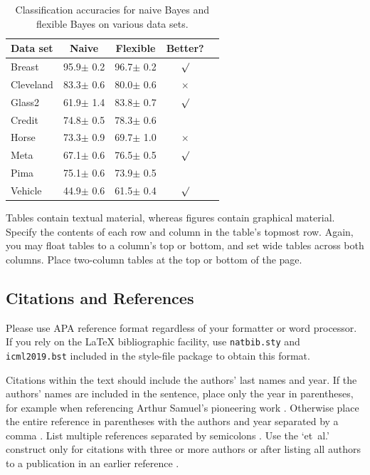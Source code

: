 \documentclass{article}
\begin{document}
\begin{table}[t]
\caption{Classification accuracies for naive Bayes and flexible
Bayes on various data sets.}
\label{sample-table}
\vskip 0.15in
\begin{center}
\begin{small}
\begin{sc}
\begin{tabular}{lcccr}
\toprule
Data set & Naive & Flexible & Better? \\
\midrule
Breast    & 95.9$\pm$ 0.2& 96.7$\pm$ 0.2& $\surd$ \\
Cleveland & 83.3$\pm$ 0.6& 80.0$\pm$ 0.6& $\times$\\
Glass2    & 61.9$\pm$ 1.4& 83.8$\pm$ 0.7& $\surd$ \\
Credit    & 74.8$\pm$ 0.5& 78.3$\pm$ 0.6&         \\
Horse     & 73.3$\pm$ 0.9& 69.7$\pm$ 1.0& $\times$\\
Meta      & 67.1$\pm$ 0.6& 76.5$\pm$ 0.5& $\surd$ \\
Pima      & 75.1$\pm$ 0.6& 73.9$\pm$ 0.5&         \\
Vehicle   & 44.9$\pm$ 0.6& 61.5$\pm$ 0.4& $\surd$ \\
\bottomrule
\end{tabular}
\end{sc}
\end{small}
\end{center}
\vskip -0.1in
\end{table}

Tables contain textual material, whereas figures contain graphical material.
Specify the contents of each row and column in the table's topmost
row. Again, you may float tables to a column's top or bottom, and set
wide tables across both columns. Place two-column tables at the
top or bottom of the page.

\subsection{Citations and References}

Please use APA reference format regardless of your formatter
or word processor. If you rely on the \LaTeX\/ bibliographic
facility, use \texttt{natbib.sty} and \texttt{icml2019.bst}
included in the style-file package to obtain this format.

Citations within the text should include the authors' last names and
year. If the authors' names are included in the sentence, place only
the year in parentheses, for example when referencing Arthur Samuel's
pioneering work . Otherwise place the entire
reference in parentheses with the authors and year separated by a
comma \cite{Samuel59}. List multiple references separated by
semicolons \cite{kearns89,Samuel59,mitchell80}. Use the `et~al.'
construct only for citations with three or more authors or after
listing all authors to a publication in an earlier reference \cite{MachineLearningI}.
\end{document}
